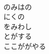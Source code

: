 \documentclass[10pt,b5j]{tarticle} %
\begin{document}
\begin{enumerate}
\begin{minipage}[c]{\blocksize}
    \end{minipage}
    \begin{minipage}[c]{\blocksize}
        
        \vspace{\linespace}
        \item~\\
        のみはの\\
        にくの\\
        をみわし\\
        とがする\\
        ここががやる
    
    \end{minipage}
\end{enumerate} %
\end{document}
